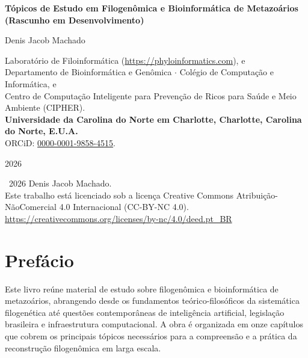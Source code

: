 \documentclass[11pt,a4paper,openright,twoside]{book}
\theoremstyle{definition}
\theoremstyle{plain}
\theoremstyle{remark}
\begin{document}
\frontmatter

\begin{titlepage}
\centering
\vspace*{3cm}
{\Huge\bfseries Tópicos de Estudo em Filogenômica e Bioinformática de Metazoários (Rascunho em Desenvolvimento)\par}
\vspace{1.5cm}
{\Large Denis Jacob Machado\par}
\vspace{0.5cm}
{\scriptsize
    Laboratório de Filoinformática (\url{https://phyloinformatics.com}), e\\
    Departamento de Bioinformática e Genômica $\cdot$ Colégio de Computação e Informática, e\\
    Centro de Computação Inteligente para Prevenção de Ricos para Saúde e Meio Ambiente (CIPHER).\\
    \textbf{Universidade da Carolina do Norte em Charlotte, Charlotte, Carolina do Norte, E.U.A.}\\
    ORCiD: \href{https://orcid.org/0000-0001-9858-4515}{0000-0001-9858-4515}.\\
    \par
}
\vfill
{\large 2026\par}
\end{titlepage}

\newpage
\thispagestyle{empty}
\vspace*{\fill}
\noindent
\textcopyright\ 2026 Denis Jacob Machado.\\[0.5em]
Este trabalho está licenciado sob a licença Creative Commons
Atribuição-NãoComercial 4.0 Internacional (CC-BY-NC 4.0).\\[0.5em]
\url{https://creativecommons.org/licenses/by-nc/4.0/deed.pt_BR}
\vspace{2cm}

\tableofcontents

\chapter{Prefácio}

    Este livro reúne material de estudo sobre filogenômica e bioinformática de metazoários, abrangendo desde os fundamentos teórico-filosóficos da sistemática filogenética até questões contemporâneas de inteligência artificial, legislação brasileira e infraestrutura computacional. A obra é organizada em onze capítulos que cobrem os principais tópicos necessários para a compreensão e a prática da reconstrução filogenômica em larga escala.
\end{document}
